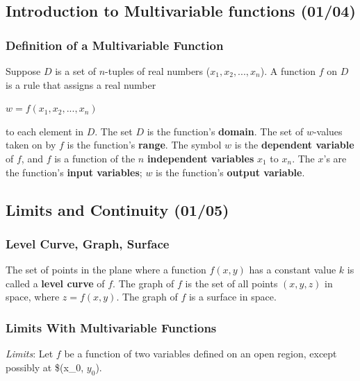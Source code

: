 \documentclass[
  letterpaper,
  DIV=11,
  numbers=noendperiod]{scrartcl}
\begin{document}
\subsection{Introduction to Multivariable functions
(01/04)}\label{introduction-to-multivariable-functions-0104}

\subsubsection{Definition of a Multivariable
Function}\label{definition-of-a-multivariable-function}

Suppose \(D\) is a set of \(n\)-tuples of real numbers
(\(x_1, x_2, ..., x_n\)). A function \(f\) on \(D\) is a rule that
assigns a real number

\(w = f(x_1, x_2, ..., x_n)\)

to each element in \(D\). The set \(D\) is the function's
\textbf{domain}. The set of \(w\)-values taken on by \(f\) is the
function's \textbf{range}. The symbol \(w\) is the \textbf{dependent
variable} of \(f\), and \(f\) is a function of the \(n\)
\textbf{independent variables} \(x_1\) to \(x_n\). The \(x\)'s are the
function's \textbf{input variables}; \(w\) is the function's
\textbf{output variable}.

\subsection{Limits and Continuity
(01/05)}\label{limits-and-continuity-0105}

\subsubsection{Level Curve, Graph,
Surface}\label{level-curve-graph-surface}

The set of points in the plane where a function \(f(x, y)\) has a
constant value \(k\) is called a \textbf{level curve} of \(f\). The
graph of \(f\) is the set of all points \((x, y, z)\) in space, where
\(z = f(x, y)\). The graph of \(f\) is a surface in space.

\subsubsection{Limits With Multivariable
Functions}\label{limits-with-multivariable-functions}

\emph{Limits}: Let \(f\) be a function of two variables defined on an
open region, except possibly at \$(x\_0, \(y_0\)).
\end{document}
